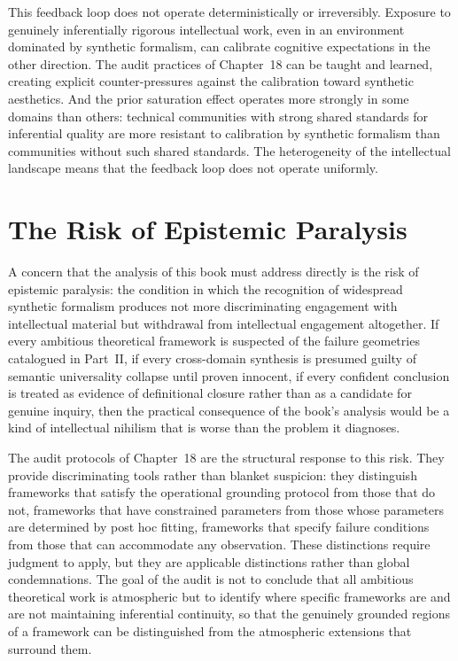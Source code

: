\documentclass[12pt, openright, twoside]{book}
\begin{document}
This feedback loop does not operate deterministically or irreversibly.
Exposure to genuinely inferentially rigorous intellectual work, even in
an environment dominated by synthetic formalism, can calibrate cognitive
expectations in the other direction. The audit practices of Chapter~18
can be taught and learned, creating explicit counter-pressures against
the calibration toward synthetic aesthetics. And the prior saturation
effect operates more strongly in some domains than others: technical
communities with strong shared standards for inferential quality are
more resistant to calibration by synthetic formalism than communities
without such shared standards. The heterogeneity of the intellectual
landscape means that the feedback loop does not operate uniformly.

\section{The Risk of Epistemic Paralysis}

A concern that the analysis of this book must address directly is the
risk of epistemic paralysis: the condition in which the recognition of
widespread synthetic formalism produces not more discriminating engagement
with intellectual material but withdrawal from intellectual engagement
altogether. If every ambitious theoretical framework is suspected of
the failure geometries catalogued in Part~II, if every cross-domain
synthesis is presumed guilty of semantic universality collapse until
proven innocent, if every confident conclusion is treated as evidence
of definitional closure rather than as a candidate for genuine inquiry,
then the practical consequence of the book's analysis would be a kind
of intellectual nihilism that is worse than the problem it diagnoses.

The audit protocols of Chapter~18 are the structural response to this
risk. They provide discriminating tools rather than blanket suspicion:
they distinguish frameworks that satisfy the operational grounding protocol
from those that do not, frameworks that have constrained parameters from
those whose parameters are determined by post hoc fitting, frameworks
that specify failure conditions from those that can accommodate any
observation. These distinctions require judgment to apply, but they
are applicable distinctions rather than global condemnations. The goal
of the audit is not to conclude that all ambitious theoretical work
is atmospheric but to identify where specific frameworks are and are
not maintaining inferential continuity, so that the genuinely grounded
regions of a framework can be distinguished from the atmospheric
extensions that surround them.
\end{document}
